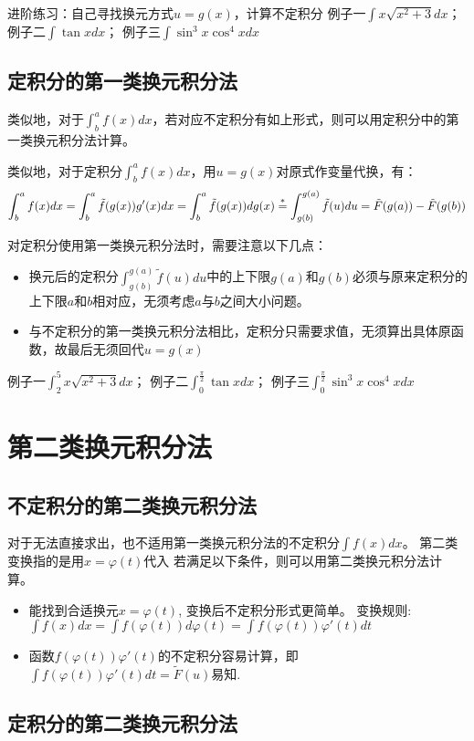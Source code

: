 \documentclass[lang=cn,newtx,10pt,scheme=chinese]{elegantbook}
\begin{document}
进阶练习：自己寻找换元方式$u=g(x)$，计算不定积分
例子一$\int x \sqrt{x^2+3}dx$；
例子二$\int \tan x dx$；
例子三$\int \sin^3x\cos^4xdx$

\subsection{定积分的第一类换元积分法}
类似地，对于$\int_b^af(x)dx$，若对应不定积分有如上形式，则可以用定积分中的第一类换元积分法计算。
\begin{theorem}[第一类换元积分法]
  类似地，对于定积分$\int_{b}^{a} f(x)dx$，用$u=g(x)$对原式作变量代换，有：
  \begin{equation*}
    \int_b^a f(x)dx = \int_b^a \tilde{f}(g(x))g'(x)dx = \int_b^a \tilde{f}(g(x))dg(x)
    \overset{\rm{*}}= \int_{g(b)}^{g(a)} \tilde{f}(u)du = \tilde{F}(g(a))-\tilde{F}(g(b)) 
  \end{equation*}
\end{theorem}

对定积分使用第一类换元积分法时，需要注意以下几点：
\begin{itemize}
\item 换元后的定积分$\int_{g(b)}^{g(a)}\tilde{f}(u)du$中的上下限$g(a)$和$g(b)$必须与原来定积分的上下限$a$和$b$相对应，无须考虑$a$与$b$之间大小问题。
  \item 与不定积分的第一类换元积分法相比，定积分只需要求值，无须算出具体原函数，故最后无须回代$u=g(x)$
\end{itemize}
例子一$\int_2^{5} x \sqrt{x^2+3}dx$；
例子二$\int_{0}^{\frac{\pi}{2}} \tan x dx$；
例子三$\int_0^{\frac{\pi}{2}} \sin^3x\cos^4xdx$

\section{第二类换元积分法}
\subsection{不定积分的第二类换元积分法}
对于无法直接求出，也不适用第一类换元积分法的不定积分$\int f(x)dx$。
第二类变换指的是用$x=\varphi(t)$代入
若满足以下条件，则可以用第二类换元积分法计算。
\begin{itemize}
\item 能找到合适换元$x=\varphi(t)$, 变换后不定积分形式更简单。
变换规则:$\int f(x)dx = \int f(\varphi(t))d\varphi(t) = \int f(\varphi(t))\varphi '(t)dt$ 
\item 函数$f(\varphi(t))\varphi '(t)$的不定积分容易计算，即$\int f(\varphi(t))\varphi '(t)dt = \tilde{F}(u)$易知.
\end{itemize}

\subsection{定积分的第二类换元积分法}
\end{document}
